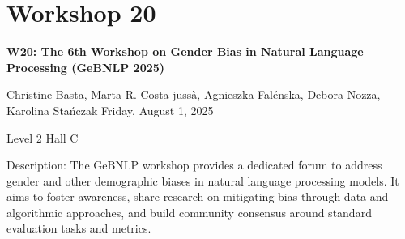 \clearpage


\section[W20: The 6th Workshop on Gender Bias in Natural Language Processing (GeBNLP 2025)]{Workshop 20}
\label{workshop_20}

\begin{center}
    {\Large \textbf{W20: The 6th Workshop on Gender Bias in Natural Language Processing (GeBNLP 2025)}}

Christine Basta, Marta R. Costa-jussà, Agnieszka Falénska, Debora Nozza, Karolina Stańczak
    Friday, August 1, 2025
    
 Level 2 Hall C
\end{center}

Description: The GeBNLP workshop provides a dedicated forum to address gender and other demographic biases in natural language processing models. It aims to foster awareness, share research on mitigating bias through data and algorithmic approaches, and build community consensus around standard evaluation tasks and metrics.

